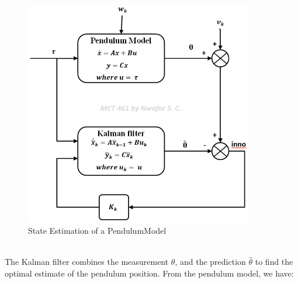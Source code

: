 \documentclass{article}
\begin{document}
\begin{figure}[h!]
\begin{center}
\includegraphics[width=10.0cm]{Kalman_filter_model_pendulum}
\caption{State Estimation of a PendulumModel}
\label{fig1}
\end{center}
\end{figure}
\\
The Kalman filter combines the measurement $\theta$, and the prediction $\hat{\theta}$ to find the optimal estimate of the pendulum position. From the pendulum model, we have:\\
\end{document}
